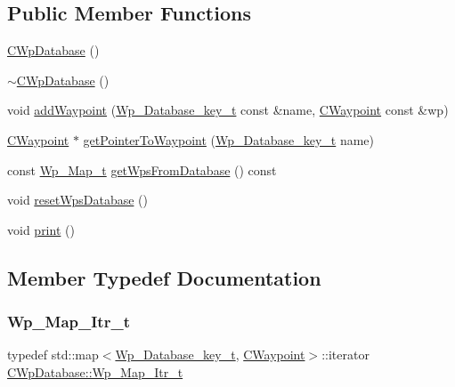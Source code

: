 \subsection*{Public Member Functions}
\begin{DoxyCompactItemize}
\item 
\hyperlink{classCWpDatabase_a373c0ba6b4524115cda152273a713017}{C\+Wp\+Database} ()
\item 
\hyperlink{classCWpDatabase_a9c8209e9d6ba9a4c275cb4f6266950d6}{$\sim$\+C\+Wp\+Database} ()
\item 
void \hyperlink{classCWpDatabase_a96d64308fe52f48b423d7c97f9e95dcf}{add\+Waypoint} (\hyperlink{CWpDatabase_8h_af4bde7780fd7a000e6647ae788fe5a10}{Wp\+\_\+\+Database\+\_\+key\+\_\+t} const \&name, \hyperlink{classCWaypoint}{C\+Waypoint} const \&wp)
\item 
\hyperlink{classCWaypoint}{C\+Waypoint} $\ast$ \hyperlink{classCWpDatabase_a5e7031a38c729dc54ff48834e2a7902f}{get\+Pointer\+To\+Waypoint} (\hyperlink{CWpDatabase_8h_af4bde7780fd7a000e6647ae788fe5a10}{Wp\+\_\+\+Database\+\_\+key\+\_\+t} name)
\item 
const \hyperlink{classCWpDatabase_acdf43fd8206955eeb54807e9254958cb}{Wp\+\_\+\+Map\+\_\+t} \hyperlink{classCWpDatabase_ad264883102664dde8c25fa8f11e41087}{get\+Wps\+From\+Database} () const
\item 
void \hyperlink{classCWpDatabase_a13e513a40e9339ae56f1c8b77eb0b9d3}{reset\+Wps\+Database} ()
\item 
void \hyperlink{classCWpDatabase_a14ca531b56bffb1dc354c5a688115d74}{print} ()
\end{DoxyCompactItemize}


\subsection{Member Typedef Documentation}
\mbox{\label{classCWpDatabase_a3fbf501fb525f4f45171e7811596fc10}} 
\subsubsection{\texorpdfstring{Wp\+\_\+\+Map\+\_\+\+Itr\+\_\+t}{Wp\_Map\_Itr\_t}}
{\footnotesize\ttfamily typedef std\+::map$<$\hyperlink{CWpDatabase_8h_af4bde7780fd7a000e6647ae788fe5a10}{Wp\+\_\+\+Database\+\_\+key\+\_\+t}, \hyperlink{classCWaypoint}{C\+Waypoint}$>$\+::iterator \hyperlink{classCWpDatabase_a3fbf501fb525f4f45171e7811596fc10}{C\+Wp\+Database\+::\+Wp\+\_\+\+Map\+\_\+\+Itr\+\_\+t}}

